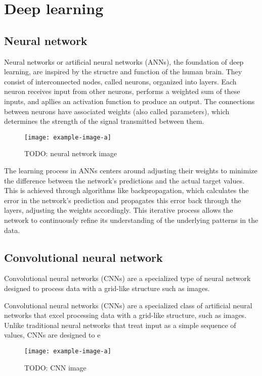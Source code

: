 \section{Deep learning}

\subsection{Neural network}
Neural networks or artificial neural networks (ANNs), the foundation of deep learning, are inspired by the structre and function of the human brain.
They consist of interconnected nodes, called neurons, organized into layers.
Each neuron receives input from other neurons, performs a weighted sum of these inputs, and apllies an activation function to produce an output.
The connections between neurons have associated weights (also called parameters), which determines the strength of the signal transmitted between them.

\begin{figure}[hbtp]
\centering    
\texttt{[image: example-image-a]}
\caption{TODO: neural network image}
\end{figure}

The learning process in ANNs centers around adjusting their weights to minimize the difference between the network's predictions and the actual target values.
This is achieved through algorithms like backpropagation, which calculates the error in the network's prediction and propagates this error back through the layers, adjusting the weights accordingly.
This iterative process allows the network to continuously refine its understanding of the underlying patterns in the data.

\subsection{Convolutional neural network}
Convolutional neural networks (CNNs) are a specialized type of neural network designed to process data with a grid-like structure such as images.

Convolutional neural networks (CNNs) are a specialized class of artificial neural networks that excel processing data with a grid-like structure, such as images.
Unlike traditional neural networks that treat input as a simple sequence of values, CNNs are designed to e

\begin{figure}[hbtp]
\centering    
\texttt{[image: example-image-a]}
\caption{TODO: CNN image}
\end{figure}


